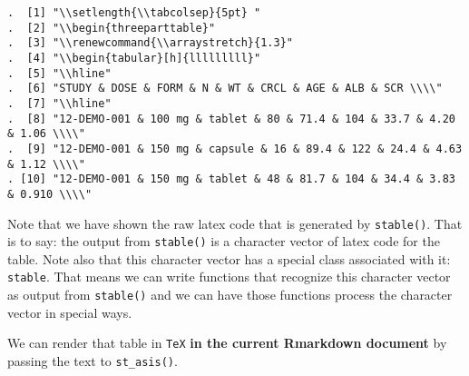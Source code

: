 \documentclass[
]{book}
\newenvironment{Shaded}{\begin{snugshade}}{\end{snugshade}}
\newcommand{\KeywordTok}[1]{\textcolor[rgb]{0.13,0.29,0.53}{\textbf{#1}}}
\newcommand{\NormalTok}[1]{#1}
\newcommand{\OperatorTok}[1]{\textcolor[rgb]{0.81,0.36,0.00}{\textbf{#1}}}
\newcommand{\StringTok}[1]{\textcolor[rgb]{0.31,0.60,0.02}{#1}}
\begin{document}
\begin{verbatim}
.  [1] "\\setlength{\\tabcolsep}{5pt} "                                            
.  [2] "\\begin{threeparttable}"                                                   
.  [3] "\\renewcommand{\\arraystretch}{1.3}"                                       
.  [4] "\\begin{tabular}[h]{lllllllll}"                                            
.  [5] "\\hline"                                                                   
.  [6] "STUDY & DOSE & FORM & N & WT & CRCL & AGE & ALB & SCR \\\\"                
.  [7] "\\hline"                                                                   
.  [8] "12-DEMO-001 & 100 mg & tablet & 80 & 71.4 & 104 & 33.7 & 4.20 & 1.06 \\\\" 
.  [9] "12-DEMO-001 & 150 mg & capsule & 16 & 89.4 & 122 & 24.4 & 4.63 & 1.12 \\\\"
. [10] "12-DEMO-001 & 150 mg & tablet & 48 & 81.7 & 104 & 34.4 & 3.83 & 0.910 \\\\"
\end{verbatim}

Note that we have shown the raw latex code that is generated by \texttt{stable()}. That
is to say: the output from \texttt{stable()} is a character vector of latex code
for the table. Note also that this character vector has a special class
associated with it: \texttt{stable}. That means we can write functions that recognize
this character vector as output from \texttt{stable()} and we can have those functions
process the character vector in special ways.

We can render that table in \texttt{TeX} \textbf{in the current Rmarkdown document} by
passing the text to \texttt{st\_asis()}.

\begin{Shaded}
\end{Shaded}
\end{document}
